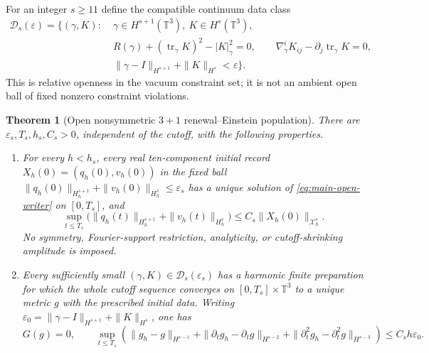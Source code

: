 \documentclass[11pt]{article}
\newtheorem{theorem}{Theorem}[section]
\theoremstyle{definition}
\theoremstyle{remark}
\newcommand{\tr}{\operatorname{tr}}
\begin{document}
For an integer $s\ge11$ define the compatible continuum data class
\begin{equation}
 \begin{split}
 \mathcal D_s(\varepsilon)=\bigl\{(\gamma,K):\;&
 \gamma\in H^{s+1}(\mathbb T^3),\ K\in H^s(\mathbb T^3),\\
 &R(\gamma)+(\tr_\gamma K)^2-|K|_\gamma^2=0,\qquad
 \nabla_\gamma^iK_{ij}-\partial_j\tr_\gamma K=0,\\
 &\|\gamma-I\|_{H^{s+1}}+\|K\|_{H^s}<\varepsilon\bigr\}.
 \end{split}
 \label{eq:main-open-data-class}
\end{equation}
This is relative openness in the vacuum constraint set; it is not an ambient
open ball of fixed nonzero constraint violations.

\begin{theorem}[Open nonsymmetric $3+1$ renewal--Einstein population]
\label{thm:main-open-3plus1}
There are $\varepsilon_s,T_s,h_s,C_s>0$, independent of the cutoff, with the
following properties.
\begin{enumerate}[label=\textup{(O\arabic*)},leftmargin=3em]
\item For every $h<h_s$, every real ten-component initial record
      $X_h(0)=(q_h(0),v_h(0))$ in the fixed ball
      $\|q_h(0)\|_{H_h^{s+1}}+\|v_h(0)\|_{H_h^s}\le\varepsilon_s$
      has a unique solution of \eqref{eq:main-open-writer} on $[0,T_s]$, and
      \begin{equation}
       \sup_{t\le T_s}
       \bigl(\|q_h(t)\|_{H_h^{s+1}}+\|v_h(t)\|_{H_h^s}\bigr)
       \le C_s\|X_h(0)\|_{\mathcal X_h^s}.
       \label{eq:main-open-uniform-time}
      \end{equation}
      No symmetry, Fourier-support restriction, analyticity, or
      cutoff-shrinking amplitude is imposed.
\item Every sufficiently small $(\gamma,K)\in\mathcal D_s(\varepsilon_s)$
      has a harmonic finite preparation for which the whole cutoff sequence
      converges on $[0,T_s]\times\mathbb T^3$ to a unique metric $g$ with the
      prescribed initial data.  Writing
      $\varepsilon_0=\|\gamma-I\|_{H^{s+1}}+\|K\|_{H^s}$, one has
      \begin{equation}
       \boxed{G(g)=0,\qquad
       \sup_{t\le T_s}\left(
       \|g_h-g\|_{H^{s-1}}+\|\partial_tg_h-\partial_tg\|_{H^{s-2}}
       +\|\partial_t^2g_h-\partial_t^2g\|_{H^{s-3}}
       \right)\le C_sh\varepsilon_0.}
       \label{eq:main-open-einstein-rate}
      \end{equation}

\end{enumerate}
\end{theorem}
\end{document}

